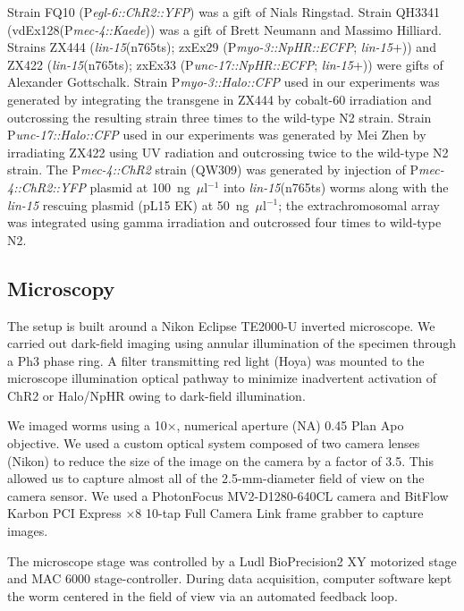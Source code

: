Strain FQ10 (P\textit{egl-6::ChR2::YFP}) was a gift of Nials Ringstad. Strain QH3341 (vdEx128(P\textit{mec-4::Kaede})) was a gift of Brett Neu\-mann and Massimo Hill\-iard. Strains ZX444 (\textit{lin-15}(n765ts); zxEx29 (P\textit{myo-3::NpHR::ECFP}; \textit{lin-15}+)) and ZX422 (\textit{lin-15}(n765ts); zxEx33 (P\textit{unc-17::NpHR::ECFP}; \textit{lin-15}+)) were gifts of Alex\-ander Gotts\-chalk. Strain P\textit{myo-3::Halo::CFP} used in our experiments was generated by integrating the trans\-gene in ZX444 by cobalt-60 irradiation and outcrossing the resulting strain three times to the wild-type N2 strain. Strain P\textit{unc-17::Halo::CFP} used in our experiments was generated by Mei Zhen by irradiating ZX422 using UV radiation and outcrossing twice to the wild-type N2 strain. The P\textit{mec-4::ChR2} strain (QW309) was generated by injection of P\textit{mec-4::ChR2::YFP} plasmid at 100~ng~$\mu$l$^{-1}$ into \textit{lin-15}(n765ts) worms along with the \textit{lin-15} rescuing plasmid (pL15 EK) at 50~ng~$\mu$l$^{-1}$; the extrachromosomal array was integrated using gamma irradiation and outcrossed four times to wild-type N2.

\subsection{Microscopy}
The setup is built around a Nikon Eclipse TE2000-U inverted microscope. We carried out dark-field imaging using annular illumination of the specimen through a Ph3 phase ring. A filter transmitting red light (Hoya) was mounted to the microscope illumination optical pathway to minimize inadvertent activation of ChR2 or Halo/NpHR owing to dark-field illumination.

We imaged worms using a 10×, numerical aperture (NA) 0.45 Plan Apo objective. We used a custom optical system composed of two camera lenses (Nikon) to reduce the size of the image on the camera by a factor of 3.5. This allowed us to capture almost all of the 2.5-mm-diameter field of view on the camera sensor. We used a PhotonFocus MV2-D1280-640CL camera and BitFlow Karbon PCI Express ×8 10-tap Full Camera Link frame grabber to capture images.

The microscope stage was controlled by a Ludl BioPrecision2 XY motorized stage and MAC 6000 stage-controller. During data acquisition, computer software kept the worm centered in the field of view via an automated feedback loop.

